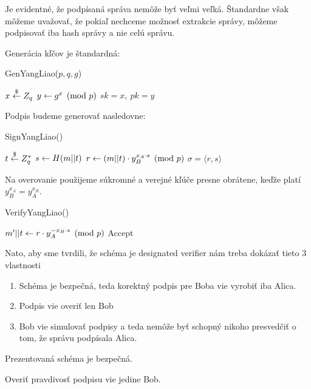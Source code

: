\begin{poznamka}
    Je evidentné, že podpísaná správa nemôže byť veľmi veľká.
    Štandardne však môžeme uvažovať, že
    pokiaľ nechceme možnosť extrakcie správy, 
    môžeme podpisovať iba hash správy a nie celú správu.
\end{poznamka}

Generácia kľčov je štandardná:
\begin{procedure}
    \caption{GenYangLiao($p,q,g$)}
    $x \overset{\$}{\leftarrow} Z_q$\;
    $y \leftarrow g^x \pmod{p}$\;
    \Return $sk=x,\ pk=y$\;
\end{procedure}


Podpis budeme generovať nasledovne:
\begin{procedure}
    \caption{SignYangLiao()}
    $t \overset{\$}{\leftarrow} Z_q^*$\;
    $s \leftarrow H(m||t)$\;    
    $r \leftarrow (m||t) \cdot y_B^{x_A \cdot s} \pmod{p}$\; 
    \Return $\sigma=\langle r, s \rangle$\;
\end{procedure}

Na overovanie použijeme súkromné a verejné kľúče presne obrátene,
keďže platí $y_B^{x_A} = y_A^{x_B}$.

\begin{procedure}
    \caption{VerifyYangLiao()}
    $m'||t \leftarrow r \cdot y_A^{-x_B\cdot s} \pmod{p}$\;
    Accept\;
\end{procedure}

Nato, aby sme tvrdili, že schéma je designated verifier nám treba
dokázať tieto 3 vlastnosti
\begin{enumerate}
    \item Schéma je bezpečná, teda korektný podpis pre Boba vie
        vyrobiť iba Alica.

    \item Podpis vie overiť len Bob 

    \item Bob vie simulovať podpisy a teda nemôže byť schopný nikoho
        presvedčiť o tom, že správu podpísala Alica.
\end{enumerate}


\begin{lema}
    Prezentovaná schéma je bezpečná.
\end{lema}
\begin{dokaz}
    \todo{}
\end{dokaz}

\begin{lema}
    Overiť pravdivosť podpisu vie jedine Bob.
\end{lema}
\begin{dokaz}
    \fixme{}
\end{dokaz}

